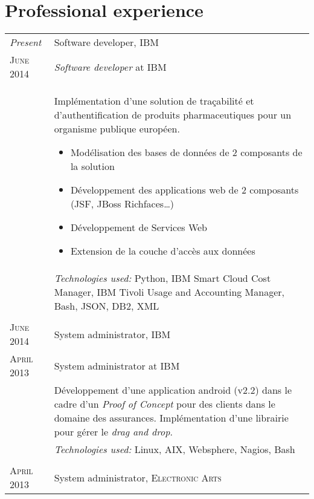 %
%
%

\section{\texorpdfstring{\color{Blue}Professional experience}{Professional experience}}
\begin{longtable}{R{2.5cm}|p{14.8cm}}
 	\emph{Present} & Software developer, \textsc{IBM}\\
 	\textsc{June 2014}& \emph{Software developer} at IBM\\&
 	\footnotesize{
 		Implémentation d'une solution de traçabilité et d'authentification
 	 	de produits pharmaceutiques pour un organisme publique européen.
 		\begin{itemize}
			\item Modélisation des bases de données de 2 composants de la solution
			\item Développement des applications web de 2 composants (JSF, JBoss Richfaces\ldots)
			\item Développement de Services Web
			\item Extension de la couche d'accès aux données
		\end{itemize}
		\vspace{-1em}
	}\\&
 	\footnotesize{\emph{Technologies used:} Python, IBM Smart Cloud Cost Manager, IBM Tivoli Usage and Accounting Manager, Bash, JSON, DB2, XML }\\
  \\
 	\textsc{June 2014} & System administrator, \textsc{IBM}\\
 	\textsc{April 2013}& System administrator at IBM\\&
 	\footnotesize{Développement d'une application android (v2.2) dans le cadre d'un \emph{Proof of Concept} 
 	pour des clients dans le domaine des assurances. Implémentation d'une librairie pour gérer le \emph{drag and drop}.}\\&
 	\footnotesize{\emph{Technologies used:} Linux, AIX, Websphere, Nagios, Bash}\\
 \\
 	\textsc{April 2013} & System administrator, \textsc{Electronic Arts}\\

\end{longtable}
